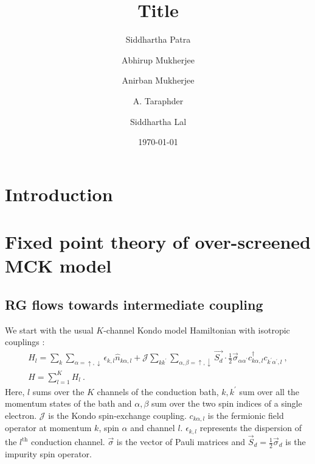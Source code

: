 \documentclass[reprint,prb,superscriptaddress]{revtex4-2}
\begin{document}
\title{Title}
\author{Siddhartha Patra}
\author{Abhirup Mukherjee}
\author{Anirban Mukherjee}
\author{A. Taraphder}
\author{Siddhartha Lal}
\date{\today}
\begin{abstract}
	\lipsum[1-2]
\end{abstract}
\maketitle


\section{Introduction}
\lipsum[1-10]

\section{Fixed point theory of over-screened MCK model}

\subsection{RG flows towards intermediate coupling}
\label{rg_flow_section}
We start with the usual \(K\)-channel Kondo model Hamiltonian with isotropic couplings \cite{Noz_blandin_1980}:
\begin{gather}
	\label{mc_ham}
	H_l = \sum_{k}\sum_{\alpha=\uparrow,\downarrow}\epsilon_{k,l} \hat n_{k\alpha,l} + \mathcal{J}\sum_{kk^\prime} \sum_{\alpha,\beta= \uparrow,\downarrow}\vec{S_d}\cdot\frac{1}{2}\vec{\sigma}_{\alpha\alpha^\prime}c_{k\alpha,l}^\dagger c_{k^\prime\alpha^\prime, l}~,\nonumber\\
	H = \sum_{l=1}^K H_l~.
\end{gather}
Here, \(l\) sums over the \(K\) channels of the conduction bath, \(k,k^\prime\) sum over all the momentum states of the bath and \(\alpha,\beta\) sum over the two spin indices of a single electron. \(\mathcal{J}\) is the Kondo spin-exchange coupling. \(c_{k\alpha,l}\) is the fermionic field operator at momentum \(k\), spin \(\alpha\) and channel \(l\). \(\epsilon_{k,l}\) represents the dispersion of the \(l^\text{th}\) conduction channel. \(\vec \sigma\) is the vector of Pauli matrices and \(\vec S_d = \frac{1}{2}\vec \sigma_d\) is the impurity spin operator.
\end{document}

